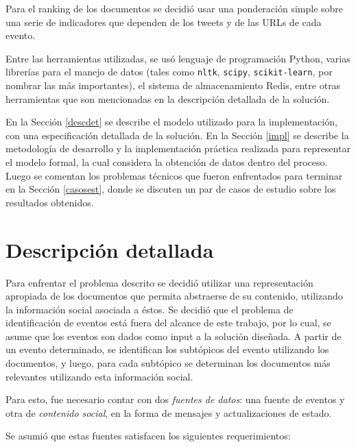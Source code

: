   Para el ranking de los documentos se decidió usar una ponderación
  simple sobre una serie de indicadores que dependen de los tweets y
  de las URLs de cada evento.

  Entre las herramientas utilizadas, se usó lenguaje de
  programación Python, varias librerías para el manejo de datos
  (tales como \texttt{nltk}, \texttt{scipy}, \texttt{scikit-learn}, por nombrar las más
  importantes), el sistema de almacenamiento Redis, entre otras
  herramientas que son mencionadas en la descripción detallada de la
  solución.

  En la Sección \ref{descdet} se describe el modelo utilizado para la
  implementación, con una especificación detallada de la solución. En la
  Sección \ref{impl} se describe la metodología de desarrollo y la
  implementación práctica realizada para representar el modelo
  formal, la cual considera la obtención de datos dentro del
  proceso. Luego se comentan los problemas técnicos que fueron
  enfrentados para terminar en la Sección \ref{casosest}, donde se discuten
  un par de casos de estudio sobre los resultados obtenidos.


\section{Descripción detallada}
\label{sec-4.1}

\label{descdet}


   Para enfrentar el problema descrito se decidió utilizar una
   representación apropiada de los documentos que permita abstraerse
   de su contenido, utilizando la información social asociada a
   éstos. Se decidió que el problema de identificación de eventos está
   fuera del alcance de este trabajo, por lo cual, se asume que los
   eventos son dados como input a la solución diseñada. A partir de un
   evento determinado, se identifican los  subtópicos del evento
   utilizando los documentos, y luego, para cada
   subtópico se determinan los documentos más relevantes utilizando
   esta información social.

   Para esto, fue necesario contar con dos \emph{fuentes de datos}: una
   fuente de eventos y otra de \emph{contenido social}, en la forma de
   mensajes y actualizaciones de estado.

   Se asumió que estas fuentes satisfacen los siguientes
   requerimientos:

